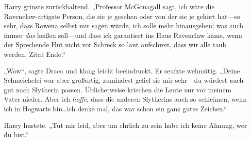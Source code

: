 Harry grinste zurückhaltend. „Professor McGonagall sagt, ich wäre die Ravenclaw-artigste Person, die sie je gesehen oder von der sie je gehört hat—so sehr, dass Rowena selbst mir sagen würde, ich solle mehr hinausgehen; was auch immer \emph{das} heißen soll—und dass ich garantiert ins Haus Ravenclaw käme, wenn der Sprechende Hut nicht vor Schreck so laut aufschreit, dass wir alle taub werden. Zitat Ende.“

„Wow“, sagte Draco und klang leicht beeindruckt. Er seufzte wehmütig. „Deine Schmeichelei war aber großartig, zumindest gefiel sie mir sehr—du würdest auch gut nach Slytherin passen. Üblicherweise kriechen die Leute nur vor meinem Vater nieder. Aber ich \emph{hoffe}, dass die anderen Slytherins auch so schleimen, wenn ich in Hogwarts bin…ich denke mal, das war schon ein ganz gutes Zeichen.“

Harry hustete. „Tut mir leid, aber um ehrlich zu sein habe ich keine Ahnung, wer du bist.“

